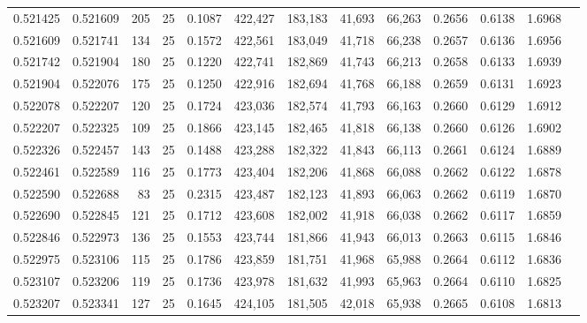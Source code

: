 \begin{tabular}{rrrrrrrrrrrrr}
0.521425 & 0.521609 &   205 &  25 &                                     0.1087 & 422,427 & 183,183 &  41,693 &  66,263 & 0.2656 & 0.6138 & 1.6968 \\
0.521609 & 0.521741 &   134 &  25 &                                     0.1572 & 422,561 & 183,049 &  41,718 &  66,238 & 0.2657 & 0.6136 & 1.6956 \\
0.521742 & 0.521904 &   180 &  25 &                                     0.1220 & 422,741 & 182,869 &  41,743 &  66,213 & 0.2658 & 0.6133 & 1.6939 \\
0.521904 & 0.522076 &   175 &  25 &                                     0.1250 & 422,916 & 182,694 &  41,768 &  66,188 & 0.2659 & 0.6131 & 1.6923 \\
0.522078 & 0.522207 &   120 &  25 &                                     0.1724 & 423,036 & 182,574 &  41,793 &  66,163 & 0.2660 & 0.6129 & 1.6912 \\
0.522207 & 0.522325 &   109 &  25 &                                     0.1866 & 423,145 & 182,465 &  41,818 &  66,138 & 0.2660 & 0.6126 & 1.6902 \\
0.522326 & 0.522457 &   143 &  25 &                                     0.1488 & 423,288 & 182,322 &  41,843 &  66,113 & 0.2661 & 0.6124 & 1.6889 \\
0.522461 & 0.522589 &   116 &  25 &                                     0.1773 & 423,404 & 182,206 &  41,868 &  66,088 & 0.2662 & 0.6122 & 1.6878 \\
0.522590 & 0.522688 &    83 &  25 &                                     0.2315 & 423,487 & 182,123 &  41,893 &  66,063 & 0.2662 & 0.6119 & 1.6870 \\
0.522690 & 0.522845 &   121 &  25 &                                     0.1712 & 423,608 & 182,002 &  41,918 &  66,038 & 0.2662 & 0.6117 & 1.6859 \\
0.522846 & 0.522973 &   136 &  25 &                                     0.1553 & 423,744 & 181,866 &  41,943 &  66,013 & 0.2663 & 0.6115 & 1.6846 \\
0.522975 & 0.523106 &   115 &  25 &                                     0.1786 & 423,859 & 181,751 &  41,968 &  65,988 & 0.2664 & 0.6112 & 1.6836 \\
0.523107 & 0.523206 &   119 &  25 &                                     0.1736 & 423,978 & 181,632 &  41,993 &  65,963 & 0.2664 & 0.6110 & 1.6825 \\
0.523207 & 0.523341 &   127 &  25 &                                     0.1645 & 424,105 & 181,505 &  42,018 &  65,938 & 0.2665 & 0.6108 & 1.6813 \\

\end{tabular}
